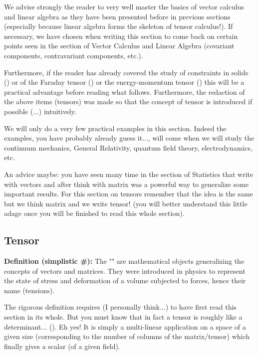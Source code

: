 	We advise strongly the reader to very well master the basics of vector calculus and linear algebra as they have been presented before in previous sections (especially because linear algebra forms the skeleton of tensor calculus!). If necessary, we have chosen when writing this section to come back on certain points seen in the section of Vector Calculus and Linear Algebra (covariant components, contravariant components, etc.).
	
	Furthermore, if the reader has already covered the study of constraints in solids () or of the Faraday tensor () or the energy-momentum tensor () this will be a practical advantage before reading what follows. Furthermore, the redaction of the above items (tensors) was made so that the concept of tensor is  introduced if possible (...) intuitively.
	
	We will only do a very few practical examples in this section. Indeed the examples, you have probably already guess it..., will come when we will study the continuum mechanics, General Relativity, quantum field theory, electrodynamics, etc.
	
	An advice maybe: you have seen many time in the section of Statistics that write with vectors and after think with matrix was a powerful way to generalize some important results. For this section on tensors remember that the idea is the same but we think matrix and we write tensor! (you will better understand this little adage once you will be finished to read this whole section).
	
	\subsection{Tensor}
	\textbf{Definition (simplistic \#\mydef):} The "" are mathematical objects generalizing the concepts of vectors and matrices. They were introduced in physics to represent the state of stress and deformation of a volume subjected to forces, hence their name (tensions).
	
	The rigorous definition requires (I personally think...) to have first read this section in its whole. But you must know that in fact a tensor is roughly like a determinant... (). Eh yes! It is simply a multi-linear application on a space of a given size (corresponding to the number of columns of the matrix/tensor) which finally gives a scalar (of a given field).
	
